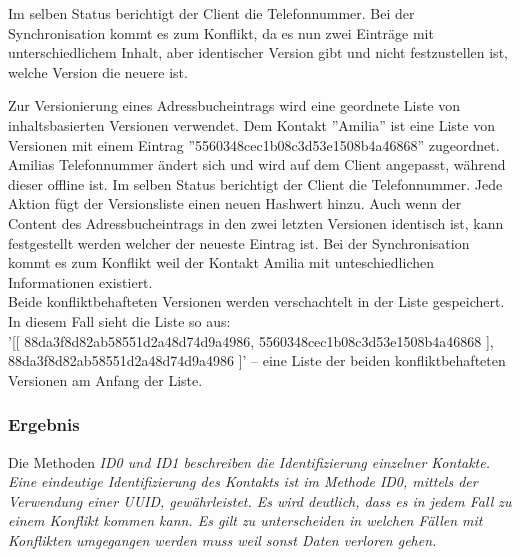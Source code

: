 \begin{description}[leftmargin=0.5cm,style=nextline]
    Im selben Status berichtigt der Client die Telefonnummer. Bei der Synchronisation kommt es zum Konflikt, da es nun zwei Einträge mit unterschiedlichem Inhalt, aber identischer Version gibt und nicht festzustellen ist, welche Version die neuere ist.\\
  \item[Methode V4 -- Liste von inhaltsbasierten Versionen:]
    Zur Versionierung eines Adressbucheintrags wird eine geordnete Liste von inhaltsbasierten Versionen verwendet.
    Dem Kontakt ''Amilia'' ist eine Liste von Versionen mit einem Eintrag ''5560348cec1b08c3d53e1508b4a46868'' zugeordnet.
    Amilias Telefonnummer ändert sich und wird auf dem Client angepasst, während dieser offline ist. Im selben Status berichtigt der Client die Telefonnummer.
    Jede Aktion fügt der Versionsliste einen neuen Hashwert hinzu.
    Auch wenn der Content des Adressbucheintrags in den zwei letzten Versionen identisch ist, kann festgestellt werden welcher der neueste Eintrag ist.
    Bei der Synchronisation kommt es zum Konflikt weil der Kontakt Amilia mit unteschiedlichen Informationen existiert.\\
    Beide konfliktbehafteten Versionen werden verschachtelt in der Liste gespeichert.
    In diesem Fall sieht die Liste so aus: \\
    '[[ 88da3f8d82ab58551d2a48d74d9a4986, 5560348cec1b08c3d53e1508b4a46868 ], 88da3f8d82ab58551d2a48d74d9a4986 ]' -- eine Liste der beiden konfliktbehafteten Versionen am Anfang der Liste.
\end{description}
%
%
\subsubsection*{Ergebnis}
Die Methoden \it{ID0} und \it{ID1} beschreiben die Identifizierung einzelner Kontakte. Eine eindeutige Identifizierung des Kontakts ist im Methode \it{ID0}, mittels der Verwendung einer \gls{UUID}, gewährleistet.
Es wird deutlich, dass es in jedem Fall zu einem Konflikt kommen kann. Es gilt zu unterscheiden in welchen Fällen mit Konflikten umgegangen werden muss weil sonst Daten verloren gehen.